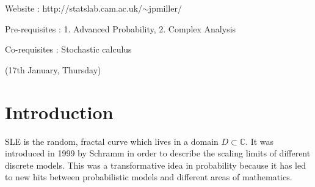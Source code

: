 \documentclass[12pt,a4paper]{article}
\begin{document}
\setlength\parindent{0pt}

Website : http://statslab.cam.ac.uk/$\sim$jpmiller/

Pre-requisites : 1. Advanced Probability, 2. Complex Analysis

Co-requisites : Stochastic calculus
\s

\newday

(17th January, Thursday)
\s

\section{Introduction}

SLE is the random, fractal curve which lives in a domain $D\subset \mathbb{C}$. It was introduced in 1999 by Schramm in order to describe the scaling limits of different discrete models. This was a transformative idea in probability because it has led to new hits between probabilistic models and different areas of mathematics.

\s
\end{document}
